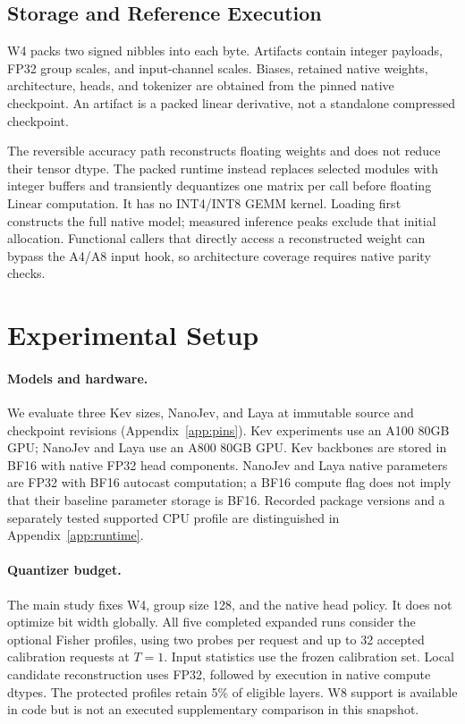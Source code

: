 \documentclass[10pt,twocolumn]{article}
\begin{document}
\subsection{Storage and Reference Execution}
W4 packs two signed nibbles into each byte. Artifacts contain integer
payloads, FP32 group scales, and input-channel scales. Biases,
retained native weights, architecture, heads, and tokenizer are obtained
from the pinned native checkpoint. An artifact is a packed
linear derivative, not a standalone compressed checkpoint.

The reversible accuracy path reconstructs floating weights and does
not reduce their tensor dtype. The packed runtime instead replaces
selected modules with integer buffers and transiently dequantizes
one matrix per call before floating $\mathrm{Linear}$ computation.
It has no INT4/INT8 GEMM kernel. Loading first constructs the full
native model; measured inference peaks exclude that initial allocation.
Functional callers that directly access a reconstructed weight can bypass
the A4/A8 input hook, so architecture coverage requires native parity checks.

\section{Experimental Setup}
\paragraph{Models and hardware.}
We evaluate three Kev sizes, NanoJev, and Laya at immutable source
and checkpoint revisions (Appendix~\ref{app:pins}).
Kev experiments use an A100 80GB GPU; NanoJev and Laya use an
A800 80GB GPU. Kev backbones are stored in BF16 with native
FP32 head components. NanoJev and Laya native parameters are
FP32 with BF16 autocast computation; a BF16 compute flag does
not imply that their baseline parameter storage is BF16.
Recorded package versions and a separately tested supported CPU profile
are distinguished in Appendix~\ref{app:runtime}.

\paragraph{Quantizer budget.}
The main study fixes W4, group size 128, and the native head policy.
It does not optimize bit width globally. All five completed expanded
runs consider the optional Fisher profiles, using two probes per
request and up to 32 accepted calibration requests at $T=1$.
Input statistics use the frozen calibration set. Local candidate
reconstruction uses FP32, followed by execution in native compute
dtypes. The protected profiles retain 5\% of eligible layers.
W8 support is available in code but is not an executed supplementary
comparison in this snapshot.
\end{document}
